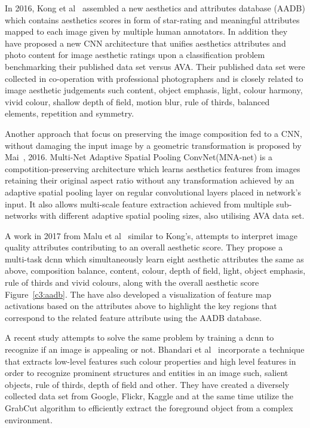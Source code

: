 In 2016, Kong et al~\cite{kong2016photo} assembled a new aesthetics and attributes database (AADB) which contains aesthetics scores in form of star-rating and meaningful attributes mapped to each image given by multiple human annotators. In addition they have proposed a new CNN architecture that unifies aesthetics attributes and photo content for image aesthetic ratings upon a classification problem benchmarking their published data set versus AVA.
Their published data set were collected in co-operation with professional photographers and is closely related to image aesthetic judgements such content, object emphasis, light, colour harmony, vivid colour, shallow depth of field, motion blur, rule of thirds, balanced elements, repetition and symmetry.


Another approach that focus on preserving the image composition fed to a CNN, without damaging the input image by a geometric transformation is proposed by Mai~\cite{mai2016composition}, 2016. Multi-Net Adaptive Spatial Pooling ConvNet(MNA-net) is a compotition-preserving architecture which learns aesthetics features from images retaining their original aspect ratio without any transformation achieved by an adaptive spatial pooling layer on regular convolutional layers placed in network's input. It also allows multi-scale feature extraction achieved from multiple sub-networks with different adaptive spatial pooling sizes, also utilising AVA data set.


A work in 2017 from Malu et al~\cite{malu2017learning} similar to Kong's, attempts to interpret image quality attributes contributing to an overall aesthetic score. They propose a multi-task dcnn which simultaneously learn eight aesthetic attributes the same as above, composition balance, content, colour, depth of field, light, object emphasis, rule of thirds and vivid colours, along with the overall aesthetic score Figure~\ref{c3:aadb}. The have also developed a visualization of feature map activations based on the attributes above to highlight the key regions that correspond to the related feature attribute using the AADB database.

A recent study attempts to solve the same problem by training a dcnn to recognize if an image is appealing or not. Bhandari et al~\cite{bhandari2020image} incorporate a technique that extracts low-level features such colour properties and high level features in order to recognize prominent structures and entities in an image such, salient objects, rule of thirds, depth of field and other. They have created a diversely collected data set from Google, Flickr, Kaggle and at the same time utilize the GrabCut algorithm to efficiently extract the foreground object from a complex environment.

